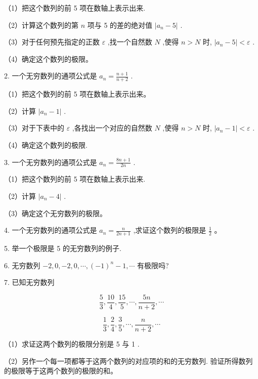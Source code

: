 \documentclass[10pt]{article}
\begin{document}
（1）把这个数列的前 5 项在数轴上表示出来.

（2）计算这个数列的第 \(n\) 项与 5 的差的绝对值 \(\left| {{a}_{n} - 5}\right|\) .

（3）对于任何预先指定的正数 \(\varepsilon\) ,找一个自然数 \(N\) ,使得 \(n > N\) 时, \(\left| {{a}_{n} - 5}\right| < \varepsilon\) .

（4）确定这个数列的极限。

2. 一个无穷数列的通项公式是 \({a}_{n} = \frac{n + 1}{n + 2}\) .

（1）把这个数列的前 5 项在数轴上表示出来。

（2）计算 \(\left| {{a}_{n} - 1}\right|\) .

（3）对于下表中的 \(\varepsilon\) ,各找出一个对应的自然数 \(N\) ,使得 \(n > N\) 时, \(\left| {{a}_{n} - 1}\right| < \varepsilon\) .

\begin{center}
\end{center}

（4）确定这个数列的极限.

3. 一个无穷数列的通项公式是 \({a}_{n} = \frac{{8n} + 1}{2n}\) .

（1）把这个数列的前 5 项在数轴上表示出来.

（2）计算 \(\left| {{a}_{n} - 4}\right|\) .

（3）确定这个无穷数列的极限。

4. 一个无穷数列的通项公式是 \({a}_{n} = \frac{n}{{2n} + 1}\) ,求证这个数列的极限是 \(\frac{1}{2}\) 。

5. 举一个极限是 5 的无穷数列的例子.

6. 无穷数列 \(- 2,0, - 2,0,\cdots ,{\left( -1\right) }^{n} - 1,\cdots\) 有极限吗?

7. 已知无穷数列

\[
\frac{5}{3},\frac{10}{4},\frac{15}{5},\cdots ,\frac{5n}{n + 2},\cdots
\]

\[
\frac{1}{3},\frac{2}{4},\frac{3}{5},\cdots ,\frac{n}{n + 2},\cdots
\]

（1）求证这两个数列的极限分别是 5 与 1 .

（2）另作一个每一项都等于这两个数列的对应项的和的无穷数列. 验证所得数列的极限等于这两个数列的极限的和。
\end{document}
